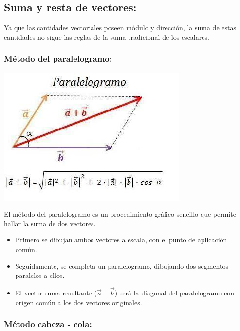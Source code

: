 \documentclass[a5paper,pagesize,10pt,bibtotoc,pointlessnumbers,
normalheadings,DIV=9,fleqn,x11names,table,twoside=false]{scrbook}
\begin{document}
\subsection{Suma y resta de vectores:}

Ya que las cantidades vectoriales poseen módulo y dirección, la suma de estas cantidades no sigue las reglas de la suma 
tradicional de los escalares.

\subsubsection{Método del paralelogramo:}

\begin{center}
 \includegraphics[scale=0.6]{images/suma-vectores-metodo-paralelogramo.jpg}
\end{center}

El método del paralelogramo es un procedimiento gráfico sencillo que permite hallar la suma de dos vectores.

\begin{itemize}
 \item Primero se dibujan ambos vectores a escala, con el punto de aplicación común.
 \item Seguidamente, se completa un paralelogramo, dibujando dos segmentos paralelos a ellos.
 \item El vector suma resultante ($\vec{a} + \vec{b}$) será la diagonal del paralelogramo con origen común a los dos 
 vectores originales.
\end{itemize}

\subsubsection{Método cabeza - cola:}
\end{document}
